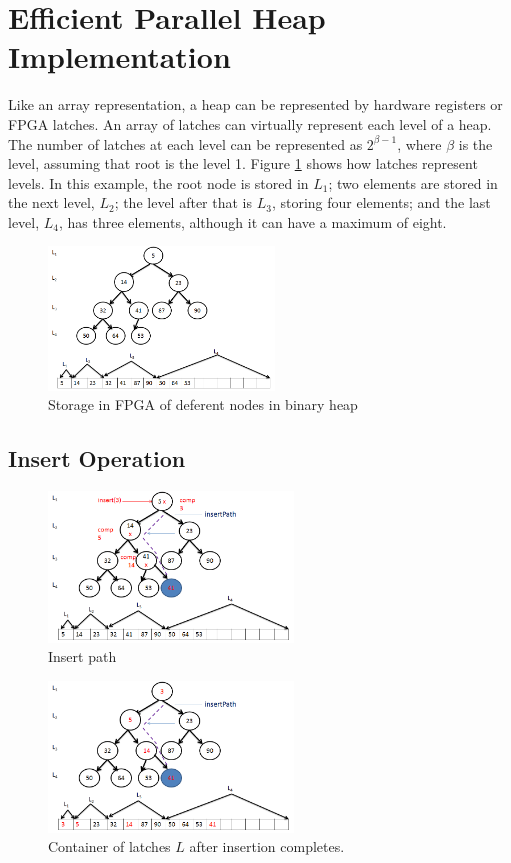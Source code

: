 \documentclass[10pt, conference, compsocconf]{IEEEtran}
\begin{document}
\section{Efficient Parallel Heap Implementation}
Like an array representation, a heap can be represented by hardware registers or FPGA latches.
An array of latches can virtually represent each level of a heap.
The number of latches at each level can be represented as $2^{\beta-1}$, where $\beta$ is the level, assuming that root is the level 1.
Figure \ref{fig5} shows how latches represent levels.
In this example, the root node is stored in $L_1$; two elements are stored in the next level, $L_2$; the level after that is $L_3$, storing four elements; and the last level, $L_4$, has three elements, although it can have a maximum of eight.

\begin{figure}[!ht]
  \centering
  \includegraphics[width=6cm]{Figures/5.png}
      \caption{Storage in FPGA of deferent nodes in binary heap}
    \label{fig5}
\end{figure}

\subsection{Insert Operation}
\begin{figure}[!ht]
  \centering
  \includegraphics[width=6.5cm]{Figures/6.png}
      \caption{Insert path}
    \label{fig6}
\end{figure}

\begin{figure}[!ht]
  \centering
  \includegraphics[width=6.5cm]{Figures/7.png}
      \caption{Container of latches $L$ after insertion completes.}
    \label{fig7}
\end{figure}
\end{document}
